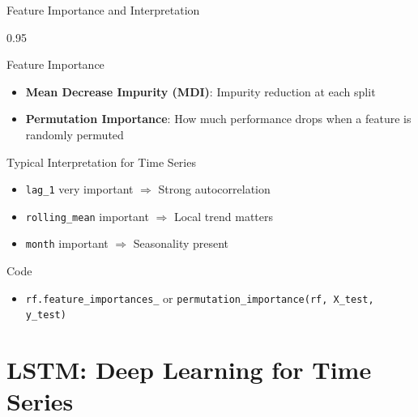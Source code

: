 \documentclass[9pt, aspectratio=169, t]{beamer}
\begin{document}
\begin{frame}{Feature Importance and Interpretation}
    \begin{cminipage}{0.95\textwidth}
    \begin{block}{Feature Importance}
        \begin{itemize}\setlength{\itemsep}{0pt}
            \item \textbf{Mean Decrease Impurity (MDI)}: Impurity reduction at each split
            \item \textbf{Permutation Importance}: How much performance drops when a feature is randomly permuted
        \end{itemize}
    \end{block}

    \vspace{0.2cm}

    \begin{exampleblock}{Typical Interpretation for Time Series}
        \begin{itemize}\setlength{\itemsep}{0pt}
            \item \texttt{lag\_1} very important $\Rightarrow$ Strong autocorrelation
            \item \texttt{rolling\_mean} important $\Rightarrow$ Local trend matters
            \item \texttt{month} important $\Rightarrow$ Seasonality present
        \end{itemize}
    \end{exampleblock}

    \vspace{0.2cm}

    {\footnotesize
    \begin{block}{Code}
        \begin{itemize}\setlength{\itemsep}{0pt}
            \item \texttt{rf.feature\_importances\_} or \texttt{permutation\_importance(rf, X\_test, y\_test)}
        \end{itemize}
    \end{block}
    }
    \end{cminipage}
\end{frame}

\section{LSTM: Deep Learning for Time Series}
\end{document}
